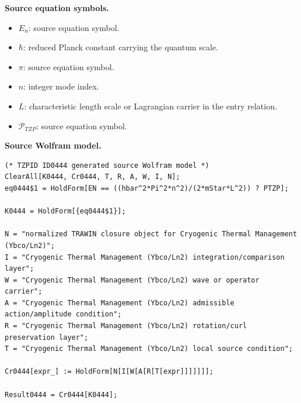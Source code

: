 \begin{minipage}[t]{0.49\linewidth}
\begingroup
\small
\raggedright
\textbf{Source equation symbols.}\par
\begin{itemize}[leftmargin=1.35em,itemsep=1pt,topsep=1pt,parsep=0pt]
    \item $E_n$: source equation symbol.
    \item $\hbar$: reduced Planck constant carrying the quantum scale.
    \item $\pi$: source equation symbol.
    \item $n$: integer mode index.
    \item $L$: characteristic length scale or Lagrangian carrier in the entry relation.
    \item $\mathcal{P}_{TZP}$: source equation symbol.
\end{itemize}
\endgroup
\end{minipage}\hfill
\begin{minipage}[t]{0.47\linewidth}
\begingroup
\scriptsize
\raggedright
\textbf{Source Wolfram model.}\par
\begin{Verbatim}[fontsize=\tiny,breaklines=true,breakanywhere=true]
(* TZPID ID0444 generated source Wolfram model *)
ClearAll[K0444, Cr0444, T, R, A, W, I, N];
eq0444$1 = HoldForm[EN == ((hbar^2*Pi^2*n^2)/(2*mStar*L^2)) ? PTZP];

K0444 = HoldForm[{eq0444$1}];

N = "normalized TRAWIN closure object for Cryogenic Thermal Management (Ybco/Ln2)";
I = "Cryogenic Thermal Management (Ybco/Ln2) integration/comparison layer";
W = "Cryogenic Thermal Management (Ybco/Ln2) wave or operator carrier";
A = "Cryogenic Thermal Management (Ybco/Ln2) admissible action/amplitude condition";
R = "Cryogenic Thermal Management (Ybco/Ln2) rotation/curl preservation layer";
T = "Cryogenic Thermal Management (Ybco/Ln2) local source condition";

Cr0444[expr_] := HoldForm[N[I[W[A[R[T[expr]]]]]]];

Result0444 = Cr0444[K0444];
\end{Verbatim}
\endgroup
\end{minipage}

